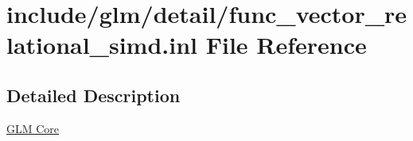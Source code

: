 \hypertarget{func__vector__relational__simd_8inl}{}\section{include/glm/detail/func\+\_\+vector\+\_\+relational\+\_\+simd.inl File Reference}
\label{func__vector__relational__simd_8inl}


\subsection{Detailed Description}
\hyperlink{group__core}{G\+LM Core} 